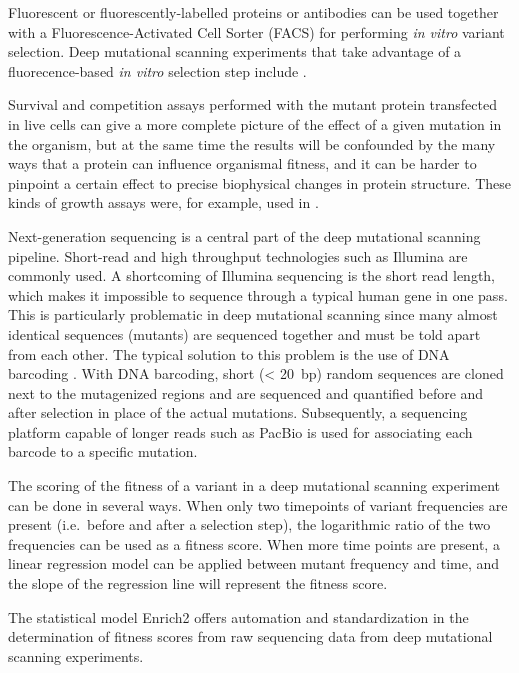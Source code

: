 Fluorescent or fluorescently-labelled proteins or antibodies can be used together with a Fluorescence-Activated Cell Sorter (FACS) for performing \textit{in vitro} variant selection.
Deep mutational scanning experiments that take advantage of a fluorecence-based \textit{in vitro} selection step include \textcite{Sarkisyan2016,Bhagavatula2017,Matreyek2017}.

Survival and competition assays performed with the mutant protein transfected in live cells can give a more complete picture of the effect of a given mutation in the organism, but at the same time the results will be confounded by the many ways that a protein can influence organismal fitness, and it can be harder to pinpoint a certain effect to precise biophysical changes in protein structure.
These kinds of growth assays were, for example, used in \textcite{Starita2015, Mishra2016}.

Next-generation sequencing is a central part of the deep mutational scanning pipeline.
Short-read and high throughput technologies such as Illumina \parencite{Bennett2004} are commonly used.
A shortcoming of Illumina sequencing is the short read length, which makes it impossible to sequence through a typical human gene in one pass.
This is particularly problematic in deep mutational scanning since many almost identical sequences (mutants) are sequenced together and must be told apart from each other.
The typical solution to this problem is the use of DNA barcoding \parencite{Hiatt2010}.
With DNA barcoding, short (\SI{< 20}{bp}) random sequences are cloned next to the mutagenized regions and are sequenced and quantified before and after selection in place of the actual mutations.
Subsequently, a sequencing platform capable of longer reads such as PacBio \parencite{Eid2009} is used for associating each barcode to a specific mutation.

The scoring of the fitness of a variant in a deep mutational scanning experiment can be done in several ways.
When only two timepoints of variant frequencies are present (i.e.\ before and after a selection step), the logarithmic ratio of the two frequencies can be used as a fitness score.
When more time points are present, a linear regression model can be applied between mutant frequency and time, and the slope of the regression line will represent the fitness score.

The statistical model Enrich2 \parencite{Rubin2017} offers automation and standardization in the determination of fitness scores from raw sequencing data from deep mutational scanning experiments.

